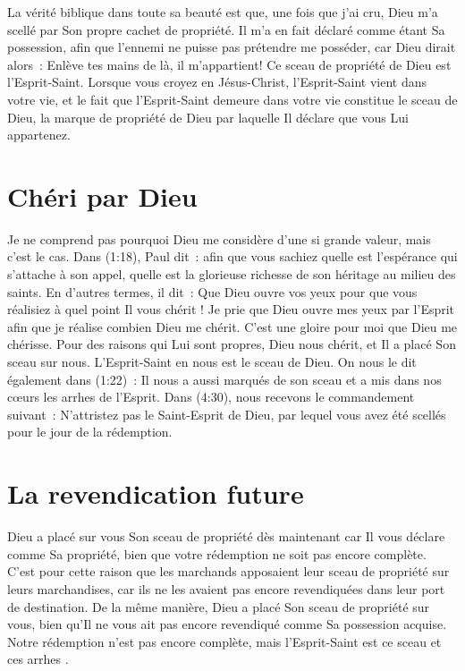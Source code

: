 La vérité biblique dans toute sa beauté est que, une fois que j'ai cru,
 Dieu m'a scellé par Son propre cachet de propriété.
 Il m'a en fait déclaré comme étant Sa possession, afin que l'ennemi
 ne puisse pas prétendre me posséder, car Dieu dirait alors~:
 \og  Enlève tes mains de là, il m'appartient! \fg{}
 Ce sceau de propriété de Dieu est l'Esprit-Saint.
 Lorsque vous croyez en Jésus-Christ, l'Esprit-Saint vient dans votre vie,
 et le fait que l'Esprit-Saint demeure dans votre vie
 constitue le sceau de Dieu, la marque de propriété de Dieu
 par laquelle Il déclare que vous Lui appartenez.


\section{Ch\'eri par Dieu}

Je ne comprend pas pourquoi Dieu me considère d'une si grande valeur,
 mais c'est le cas.
 Dans (1:18), Paul dit~:
 \og [\dots{}] afin que vous sachiez quelle est l'espérance
 qui s'attache à son appel, quelle est la glorieuse richesse
 de son héritage au milieu des saints. \fg{}
 En d'autres termes, il dit~:
 \og Que Dieu ouvre vos yeux pour que vous réalisiez
 à quel point Il vous chérit ! \fg{}
 Je prie que Dieu ouvre mes yeux par l'Esprit afin que je réalise
 combien Dieu me chérit. C'est une gloire pour moi que Dieu me chérisse.
 Pour des raisons qui Lui sont propres, Dieu nous chérit,
 et Il a placé Son sceau sur nous.
 L'Esprit-Saint en nous est le sceau de Dieu.
 On nous le dit également dans (1:22)~:
 \og Il nous a aussi marqués de son sceau et a mis dans nos cœurs
 les arrhes de l'Esprit. \fg{}
 Dans (4:30), nous recevons le commandement suivant~:
 \og N'attristez pas le Saint-Esprit de Dieu, par lequel
 vous avez été scellés pour le jour de la rédemption. \fg{}


\section{La revendication future}

Dieu a placé sur vous Son sceau de propriété dès maintenant
 car Il vous déclare comme Sa propriété, bien que votre rédemption
 ne soit pas encore complète.
 C'est pour cette raison que les marchands apposaient leur sceau de propriété
 sur leurs marchandises, car ils ne les avaient pas encore revendiquées
 dans leur port de destination.
 De la même manière, Dieu a placé Son sceau de propriété sur vous,
 bien qu'Il ne vous ait pas encore revendiqué comme Sa possession acquise.
 Notre rédemption n'est pas encore complète,
 mais l'Esprit-Saint est ce sceau et \og ces arrhes \fg{}.

